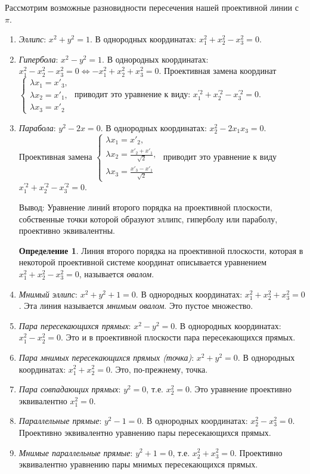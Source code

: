 \documentclass[a4paper, 12pt]{article}
\theoremstyle{definition}
\newtheorem*{definition}{Определение}
\begin{document}
Рассмотрим возможные разновидности пересечения нашей проективной линии с $\pi$.
\begin{enumerate}
    \item \textit{Эллипс}: $x^2 + y^2 = 1$. В однородных координатах: $x^2_1 + x^2_2 - x^2_3 = 0$.
    \item \textit{Гипербола}: $x^2 - y^2 = 1$. В однородных координатах: $x^2_1 - x^2_2 - x^2_3 = 0 \Leftrightarrow -x^2_1 + x^2_2 + x^2_3 = 0$. \newline 
    Проективная замена координат $\begin{cases} \lambda x_1 = x'_3, \\ \lambda x_2 = x'_1, \\ \lambda x_3 = x'_2 \end{cases}$
    приводит это уравнение к виду: $x_1^{'2} + x_2^{'2} - x_3^{'2} = 0$.
    \item \textit{Парабола}: $y^2 - 2x = 0$. В однородных координатах: $x_2^2 - 2x_1 x_3 = 0$. 
    Проективная замена $\begin{cases}
    \lambda x_1 = x'_2, \\
    \lambda x_2 = \frac{x'_2 + x'_1}{\sqrt{2}}, \\
    \lambda x_3 = \frac{x'_3 - x'_1}{\sqrt{2}}
    \end{cases}$
    приводит это уравнение к виду $x_1^{'2} + x_2^{'2} - x_3^{'2} = 0$.


Вывод: Уравнение линий второго порядка на проективной плоскости, собственные точки которой образуют эллипс, гиперболу или параболу, проективно эквивалентны.

\begin{definition}
    Линия второго порядка на проективной плоскости, которая в некоторой проективной системе координат описывается уравнением $x_1^{2} + x_2^{2} - x_3^{2} = 0$, называется \textit{овалом}.
\end{definition}

    \item \textit{Мнимый эллипс}: $x^2 + y^2 + 1 = 0$. В однородных координатах: $x_1^2 + x_2^2 + x_3^2 = 0$. Эта линия называется \textit{мнимым овалом}. Это пустое множество.
    \item \textit{Пара пересекающихся прямых}: $x^2 - y^2 = 0$. В однородных координатах: $x_1^2-x_2^2 = 0$. Это и в проективной плоскости пара пересекающихся прямых.
    \item \textit{Пара мнимых пересекающихся прямых (точка)}: $x^2 + y^2 = 0$. В однородных координатах: $x_1^2 + x_2^2 = 0$. Это, по-прежнему, точка.
    \item \textit{Пара совпадающих прямых}: $y^2 = 0$, т.е. $x_2^2 = 0$. Это уравнение проективно эквивалентно $x_1^2 = 0$.
    \item \textit{Параллельные прямые}: $y^2 - 1 = 0$. В однородных координатах: $x_2^2 - x_3^2 = 0$. Проективно эквивалентно уравнению пары пересекающихся прямых.
    \item \textit{Мнимые параллельные прямые}: $y^2 + 1 = 0$, т.е. $x_2^2 + x_3^2 = 0$. Проективно эквивалентно уравнению пары мнимых пересекающихся прямых.
\end{enumerate}
\end{document}
